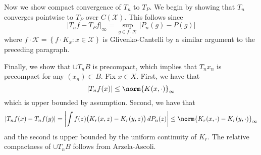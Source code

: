 \documentclass{article}
\newcommand{\abs}[1]{\left \lvert #1 \right \rvert}
\newcommand{\set}[1]{\left\{#1\right\}}
\newcommand{\1}{\mathbf{1}}
\newcommand{\Xset}{\mathcal{X}}
\theoremstyle{alden}
\theoremstyle{aldenthm}
\theoremstyle{definition}
\theoremstyle{remark}
\begin{document}
Now we show compact convergence of $T_n$ to $T_P$. We begin by showing that $T_n$ converges pointwise to $T_P$ over $C(\Xset)$. This follows since
\begin{equation*}
\abs{T_nf - T_Pf}_{\infty} = \sup_{g \in f \cdot \mathcal{K}} \abs{P_n(g) - P(g)}
\end{equation*}
where $f \cdot \mathcal{K} = \set{f \cdot K_x: x \in \Xset}$ is Glivenko-Cantelli by a similar argument to the preceding paragraph.

Finally, we show that $\cup T_nB$ is precompact, which implies that $T_nx_n$ is precompact for any $(x_n) \subset B$. Fix $x \in X$. First, we have that
\begin{equation*}
\abs{T_nf(x)} \leq \norm{K(x,\cdot)}_{\infty}
\end{equation*}
which is upper bounded by assumption. Second, we have that
\begin{equation*}
\abs{T_nf(x) - T_nf(y)} = \abs{\int f(z)\bigl(K_r(x,z) - K_r(y,z)\bigr)\,dP_n(z)} \leq \norm{K_r(x,\cdot) - K_r(y,\cdot)}_{\infty}
\end{equation*}
and the second is upper bounded by the uniform continuity of $K_r$. The relative compactness of $\cup T_nB$ follows from Arzela-Ascoli. 
\end{document}
